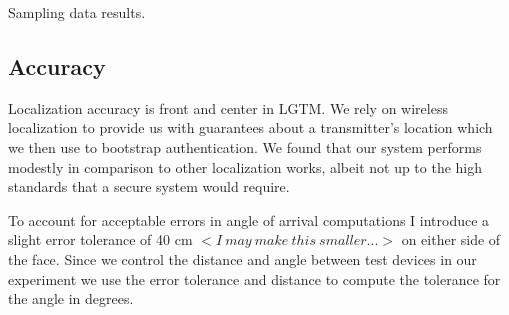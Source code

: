 \documentclass[12pt]{report}
\begin{document}
\begin{table}
    \caption{Sampling data results.}
    \label{table: sampling-data-table}
    \begin{subfigure}[b]{0.3\textwidth}
        \begin{center}
            \scalebox{0.75}{}
        \end{center}
    \end{subfigure}
    \par\bigskip
    \begin{subfigure}[b]{0.3\textwidth}
        \begin{center}
            \scalebox{0.75}{}
        \end{center}
    \end{subfigure}
    \par\bigskip
    \begin{subfigure}[b]{0.3\textwidth}
        \begin{center}
            \scalebox{0.75}{}
        \end{center}
    \end{subfigure}
    \par\bigskip
\end{table}

\subsection{Accuracy}
Localization accuracy is front and center in LGTM. We rely on wireless localization to provide us with guarantees about a transmitter's location which we then use to bootstrap authentication. We found that our system performs modestly in comparison to other localization works, albeit not up to the high standards that a secure system would require. \par

To account for acceptable errors in angle of arrival computations I introduce a slight error tolerance of 40 cm $<I \: may \: make \: this \: smaller...>$ on either side of the face. Since we control the distance and angle between test devices in our experiment we use the error tolerance and distance to compute the tolerance for the angle in degrees. \par
\end{document}
